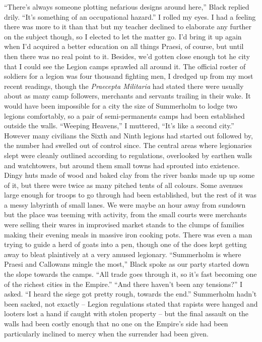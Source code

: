 \documentclass[12pt, openany]{book}
\begin{document}
“There’s always someone plotting nefarious designs around here,” Black replied drily. “It’s something of an occupational hazard.”
I rolled my eyes. I had a feeling there was more to it than that but my teacher declined to elaborate any further on the subject though, so I elected to let the matter go. I’d bring it up again when I’d acquired a better education on all things Praesi, of course, but until then there was no real point to it. Besides, we’d gotten close enough tot he city that I could see the Legion camps sprawled all around it. The official roster of soldiers for a legion was four thousand fighting men, I dredged up from my most recent readings, though the \textit{Praecepta Militaria} had stated there were usually about as many camp followers, merchants and servants trailing in their wake. It would have been impossible for a city the size of Summerholm to lodge two legions comfortably, so a pair of semi-permanents camps had been established outside the walls.
“Weeping Heavens,” I muttered, “It’s like a second city.”
However many civilians the Sixth and Ninth legions had started out followed by, the number had swelled out of control since. The central areas where legionaries slept were cleanly outlined according to regulations, overlooked by earthen walls and watchtowers, but around them small towns had sprouted into existence. Dingy huts made of wood and baked clay from the river banks made up up some of it, but there were twice as many pitched tents of all colours. Some avenues large enough for troops to go through had been established, but the rest of it was a messy labyrinth of small lanes. We were maybe an hour away from sundown but the place was teeming with activity, from the small courts were merchants were selling their wares in improvised market stands to the clumps of families making their evening meals in massive iron cooking pots. There was even a man trying to guide a herd of goats into a pen, though one of the does kept getting away to bleat plaintively at a very amused legionary.
“Summerholm is where Praesi and Callowans mingle the most,” Black spoke as our party started down the slope towards the camps. “All trade goes through it, so it’s fast becoming one of the richest cities in the Empire.”
“And there haven’t been any tensions?” I asked. “I heard the siege got pretty rough, towards the end.”
Summerholm hadn’t been sacked, not exactly – Legion regulations stated that rapists were hanged and looters lost a hand if caught with stolen property – but the final assault on the walls had been costly enough that no one on the Empire’s side had been particularly inclined to mercy when the surrender had been given.
\end{document}

